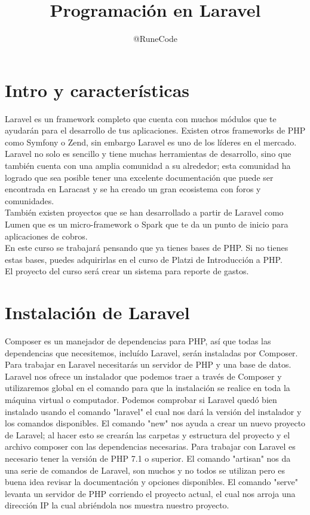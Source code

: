 \documentclass{article}
\title{Programación en Laravel}
\author{@RuneCode}
\begin{document}
\section{Intro y características}%
Laravel es un framework completo que cuenta con muchos módulos que te ayudarán
para el desarrollo de tus aplicaciones. Existen otros frameworks de PHP como
Symfony o Zend, sin embargo Laravel es uno de los líderes en el mercado.\\

Laravel no solo es sencillo y tiene muchas herramientas de desarrollo, sino que
también cuenta con una amplia comunidad a su alrededor; esta comunidad ha
logrado que sea posible tener una excelente documentación que puede ser
encontrada en Laracast y se ha creado un gran ecosistema con foros y
comunidades.\\
También existen proyectos que se han desarrollado a partir de Laravel como
Lumen que es un micro-framework o Spark que te da un punto de inicio para
aplicaciones de cobros.\\

En este curso se trabajará pensando que ya tienes bases de PHP. Si no tienes
estas bases, puedes adquirirlas en el curso de Platzi de Introducción a PHP.\\
El proyecto del curso será crear un sistema para reporte de gastos.\\

\section{Instalación de Laravel}%
Composer es un manejador de dependencias para PHP, así que todas las
dependencias que necesitemos, incluído Laravel, serán instaladas por
Composer.
Para trabajar en Laravel necesitarás un servidor de PHP y una base de datos.\\
Laravel nos ofrece un instalador que podemos traer a través de Composer y
utilizaremos global en el comando para que la instalación se realice en toda la
máquina virtual o computador.
Podemos comprobar si Laravel quedó bien instalado usando el comando "laravel"
el cual nos dará la versión del instalador y los comandos disponibles.
El comando "new" nos ayuda a crear un nuevo proyecto de Laravel; al hacer esto
se crearán las carpetas y estructura del proyecto y el archivo composer con las
dependencias necesarias.
Para trabajar con Laravel es necesario tener la versión de PHP 7.1 o
superior.
El comando "artisan" nos da una serie de comandos de Laravel, son muchos y no
todos se utilizan pero es buena idea revisar la documentación y opciones
disponibles.
El comando "serve" levanta un servidor de PHP corriendo el proyecto actual, el
cual nos arroja una dirección IP la cual abriéndola nos muestra nuestro
proyecto.\\
\end{document}
